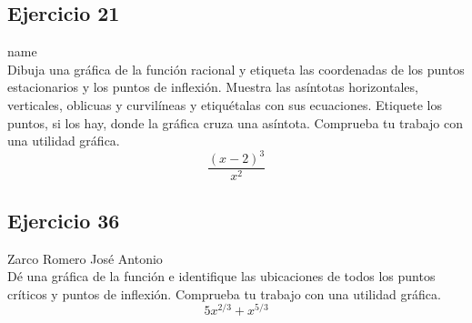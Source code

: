 \documentclass[12pt]{article}
\begin{document}
\subsection{Ejercicio 21} name \\

Dibuja una gráfica de la función racional y etiqueta las coordenadas de los puntos estacionarios y los puntos de inflexión. Muestra las asíntotas horizontales, verticales, oblicuas y curvilíneas y etiquétalas con sus ecuaciones. Etiquete los puntos, si los hay, donde la gráfica cruza una asíntota. Comprueba tu trabajo con una utilidad gráfica.
\[
\frac{(x-2)^3}{x^2}
\]

\subsection{Ejercicio 36} Zarco Romero José Antonio \\

Dé una gráfica de la función e identifique las ubicaciones de todos los puntos críticos y puntos de inflexión. Comprueba tu trabajo con una utilidad gráfica.
\[
5x^{2/3}+x^{5/3}
\]
\end{document}
